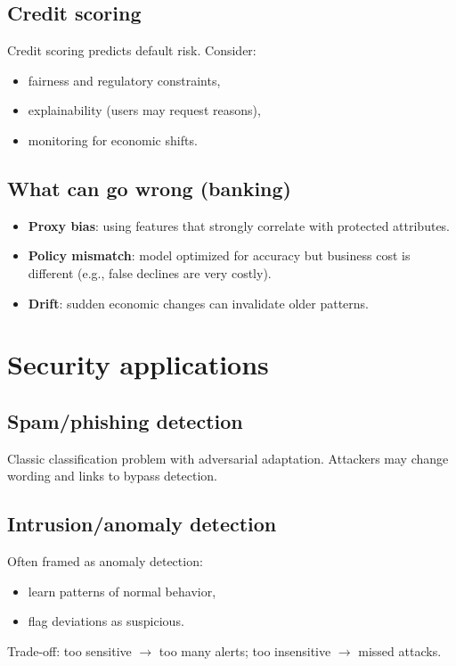 \documentclass[11pt]{article}
\begin{document}
\subsection{Credit scoring}
Credit scoring predicts default risk. Consider:
\begin{itemize}[leftmargin=*]
  \item fairness and regulatory constraints,
  \item explainability (users may request reasons),
  \item monitoring for economic shifts.
\end{itemize}

\subsection{What can go wrong (banking)}
\begin{itemize}[leftmargin=*]
  \item \textbf{Proxy bias}: using features that strongly correlate with protected attributes.
  \item \textbf{Policy mismatch}: model optimized for accuracy but business cost is different (e.g., false declines are very costly).
  \item \textbf{Drift}: sudden economic changes can invalidate older patterns.
\end{itemize}

\section{Security applications}
\subsection{Spam/phishing detection}
Classic classification problem with adversarial adaptation.
Attackers may change wording and links to bypass detection.

\subsection{Intrusion/anomaly detection}
Often framed as anomaly detection:
\begin{itemize}[leftmargin=*]
  \item learn patterns of normal behavior,
  \item flag deviations as suspicious.
\end{itemize}
Trade-off: too sensitive $\rightarrow$ too many alerts; too insensitive $\rightarrow$ missed attacks.
\end{document}
